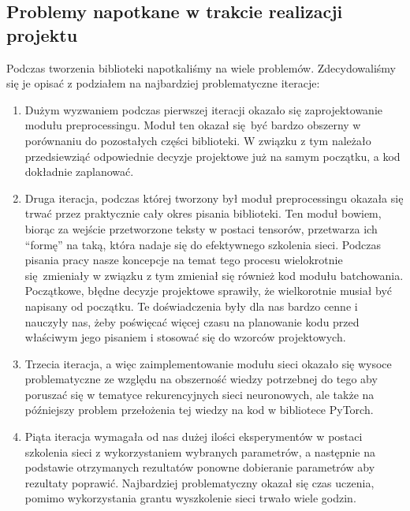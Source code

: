 \subsection{Problemy napotkane w trakcie realizacji projektu}
Podczas tworzenia biblioteki napotkaliśmy na wiele problemów. Zdecydowaliśmy się je opisać z podziałem na 
najbardziej problematyczne iteracje:

\begin{enumerate}
  \item Dużym wyzwaniem podczas pierwszej iteracji okazało
  się zaprojektowanie modułu preprocessingu. Moduł ten okazał się być bardzo obszerny w porównaniu do
  pozostałych części biblioteki. W związku z tym należało przedsiewziąć odpowiednie decyzje projektowe 
  już na samym początku, a kod dokładnie zaplanować.
  
  \item Druga iteracja, podczas której tworzony był moduł preprocessingu okazała się trwać przez praktycznie
  cały okres pisania biblioteki. Ten moduł bowiem, biorąc za wejście przetworzone teksty w postaci tensorów,
  przetwarza ich ``formę'' na taką, która nadaje się do efektywnego szkolenia sieci. Podczas pisania pracy 
  nasze koncepcje na temat tego procesu wielokrotnie się zmieniały w związku z tym zmieniał się również
  kod modułu batchowania. Początkowe, błędne decyzje projektowe sprawiły, że wielkorotnie musiał być 
  napisany od początku. Te doświadczenia były dla nas bardzo cenne i nauczyły nas, żeby poświęcać
  więcej czasu na planowanie kodu przed właściwym jego pisaniem i stosować się do wzorców projektowych.

  \item Trzecia iteracja, a więc zaimplementowanie modułu sieci okazało się wysoce problematyczne ze względu na obszerność 
  wiedzy potrzebnej do tego aby poruszać się w tematyce rekurencyjnych sieci neuronowych, ale także
  na późniejszy problem przełożenia tej wiedzy na kod w bibliotece PyTorch.
  
  \item Piąta iteracja wymagała od nas dużej ilości eksperymentów w postaci szkolenia sieci z wykorzystaniem wybranych
  parametrów, a następnie na podstawie otrzymanych rezultatów ponowne dobieranie parametrów aby rezultaty poprawić.
  Najbardziej problematyczny okazał się czas uczenia, pomimo wykorzystania grantu wyszkolenie sieci trwało
  wiele godzin.
\end{enumerate}
